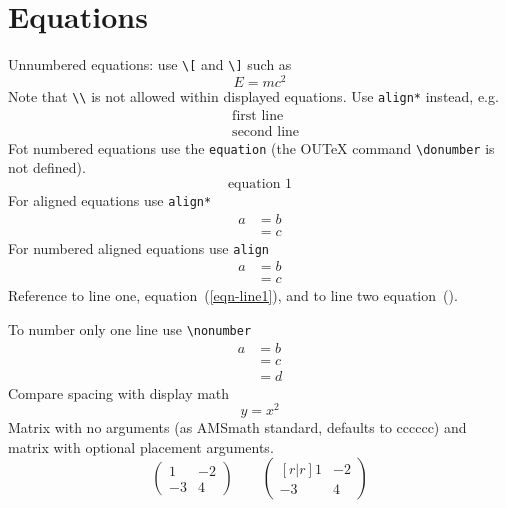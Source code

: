 \documentclass[solutionsatend,twocolumnsolutions]{ouunit}
\begin{document}
\section{Equations}
Unnumbered equations: use \verb”\[” and \verb”\]” such as
\[
E=mc^2
\]
Note that \verb”\\” is not allowed within displayed equations. Use \verb"align*" instead, e.g.
\begin{align*}
&\text{first line}\\
&\text{second line}
\end{align*}
Fot numbered equations use the \verb”equation” (the OUTeX command \verb”\donumber” is not defined).
\begin{equation}
\text{equation }1
\end{equation}
For aligned equations use \verb”align*”
\begin{align*}
a& =b\\
&=c
\end{align*}
For numbered aligned equations use \verb”align”
\begin{align}
a& =b\label{eqn-line1}\\
&=c\label{eqn-line2}
\end{align}
Reference to line one, equation~(\ref{eqn-line1}), and to line two equation~().

To number only one line use \verb”\nonumber”
\begin{align}
a& =b\nonumber\\
&=c\label{eqn-middle-line}\\
&=d\nonumber
\end{align}
Compare spacing with display math
\[
y=x^2
\]
Matrix with no arguments (as AMSmath standard, defaults to cccccc) and matrix with optional placement arguments.
\[
\begin{pmatrix}
1 & -2\\
-3 & 4
\end{pmatrix}
\qquad
\begin{pmatrix}[r|r]
1 & -2\\
-3 & 4
\end{pmatrix}
\]
\end{document}

